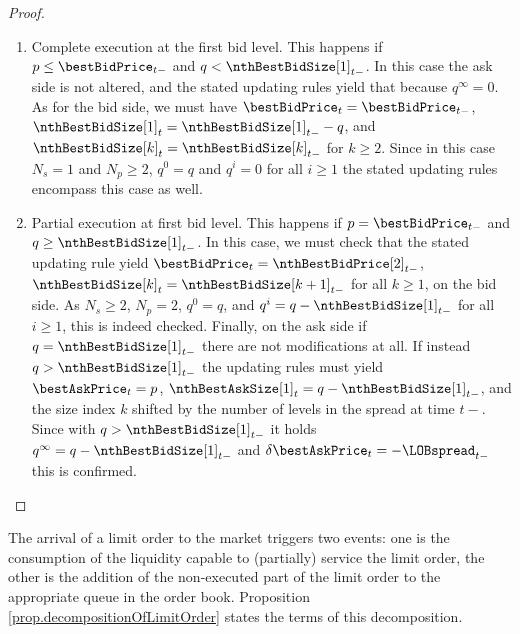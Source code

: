 \begin{proof}
\begin{enumerate}[label={\emph{\roman{*}}.}]
  we have that $\lbrace \nthBestAskSize[k]_{t}: \, k=1,2,\dots\rbrace$
  represents the sizes of $\lbrace \nthBestAskSize[k]_{t-}: \, k=1,2,\dots\rbrace$
  where the index $k$ is shifted by $-\delta\bestAskPrice_t/\tickSizeOfLOB$,
  and $\nthBestAskSize[1]_t = q$, the size of the incoming order.
  If instead there is no improvement (i.e. $p\geq \bestAskPrice_{t-}$),
  the only size $\nthBestAskSize[k]_{t-}$ that is modified
  is the one corresponding to the price $p=\bestAskPrice_t + (k-1)\tickSizeOfLOB$,
  and such modification is the addition of $q$.
  \item Complete execution at the first bid level.
  This happens if $p\leq\bestBidPrice_{t-}$ and $q<\nthBestBidSize[1]_{t-}$.
  In this case the ask side is not altered,
  and the stated updating rules yield that because $q^{\infty}=0$.
  As for the bid side, we must have
  $\bestBidPrice_t=\bestBidPrice_{t-}$,
  $\nthBestBidSize[1]_t = \nthBestBidSize[1]_{t-}- q$,
  and $\nthBestBidSize[k]_t = \nthBestBidSize[k]_{t-}$ for $k\geq 2$.
  Since in this case $N_s=1$ and $N_p\geq 2 $, $q^0 = q$ and $q^i = 0$ for all $i\geq 1$
  the stated updating rules encompass this case as well.
  \item Partial execution at first bid level.
  This happens if $p=\bestBidPrice_{t-}$ and $q\geq \nthBestBidSize[1]_{t-}$.
  In this case, we must check that the stated updating rule yield
  $\bestBidPrice_t = \nthBestBidPrice[2]_{t-}$,
  $\nthBestBidSize[k]_t = \nthBestBidSize[k+1]_{t-}$ for all $k\geq 1$, on the bid side.
  As $N_s\geq 2$, $N_p=2$, $q^0 = q$, and $q^i = q-\nthBestBidSize[1]_{t-}$ for all $i\geq 1$,
  this is indeed checked.
  Finally, on the ask side if $q=\nthBestBidSize[1]_{t-}$ there are not modifications at all.
  If instead $q>\nthBestBidSize[1]_{t-}$ the updating rules must yield
  $\bestAskPrice_t = p$, $\nthBestAskSize[1]_t = q-\nthBestBidSize[1]_{t-}$,
  and the size index $k$ shifted by the number of levels in the spread at time $t-$.
  Since with $q>\nthBestBidSize[1]_{t-}$ it holds $q^{\infty} = q-\nthBestBidSize[1]_{t-}$
  and $\delta\bestAskPrice_t = -\LOBspread_{t-}$ this is confirmed.
 \end{enumerate}
\end{proof}

The arrival of a limit order to the market triggers two events:
one is the consumption of the liquidity capable to (partially) service the limit order,
the other is the addition of the non-executed part of the limit order
to the appropriate queue in the order book.
Proposition \ref{prop.decompositionOfLimitOrder} states the terms of this decomposition.

